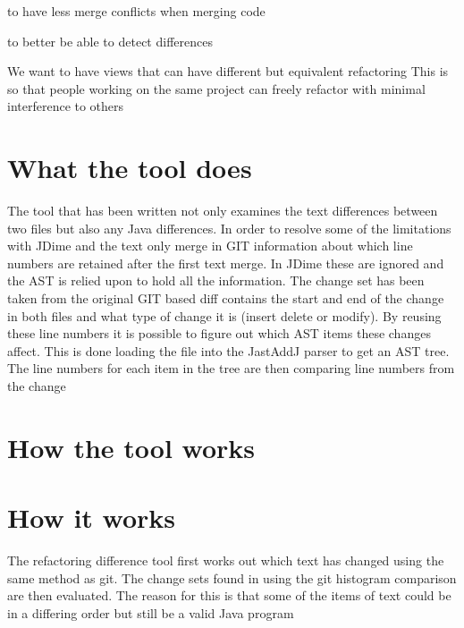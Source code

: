 

to have less merge conflicts when merging code 

to better be able to detect differences

We want to have views that can have different but equivalent refactoring
This is so that people working on the same project can freely refactor with minimal interference to others

\section{What the tool does}
The tool that has been written not only examines the text differences between two files but also any Java differences. In order to resolve some of the limitations with JDime and the text only merge in GIT information about which line numbers are retained after the first text merge.  In JDime these are ignored and the AST is relied upon to hold all the information.  The change set has been taken from the original GIT based diff contains the start and end of the change in both files and what type of change it is (insert delete or modify).  By reusing these line numbers it is possible to figure out which AST items these changes affect. This is done loading the file into the JastAddJ parser to get an AST tree. The line numbers for each item in the tree are then comparing line numbers from the change

% 
\section{How the tool works}
\section{How it works}

The refactoring difference tool first works out which text has changed using the same method as git.
The change sets found in using the git histogram comparison are then evaluated.
The reason for this is that some of the items of text could be in a differing order but still be a valid Java program

